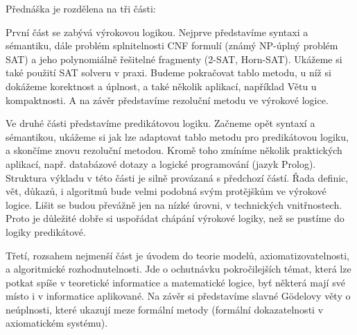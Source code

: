 Přednáška je rozdělena na tři části: 

První část se zabývá výrokovou logikou. Nejprve představíme syntaxi a sémantiku, dále problém splnitelnosti CNF formulí (známý NP-úplný problém SAT) a jeho polynomiálně řešitelné fragmenty (2-SAT, Horn-SAT). Ukážeme si také použití SAT solveru v praxi. Budeme pokračovat tablo metodu, u níž si dokážeme korektnost a úplnost, a také několik aplikací, například Větu u kompaktnosti. A na závěr představíme rezoluční metodu ve výrokové logice.

Ve druhé části představíme predikátovou logiku. Začneme opět syntaxí a sémantikou, ukážeme si jak lze adaptovat tablo metodu pro predikátovou logiku, a skončíme znovu rezoluční metodou. Kromě toho zmíníme několik praktických aplikací, např. databázové dotazy a logické programování (jazyk Prolog). Struktura výkladu v této části je silně provázaná s předchozí částí. Řada definic, vět, důkazů, i algoritmů bude velmi podobná svým protějškům ve výrokové logice. Lišit se budou převážně jen na nízké úrovni, v technických vnitřnostech. Proto je důležité dobře si uspořádat chápání výrokové logiky, než se pustíme do logiky predikátové. 

Třetí, rozsahem nejmenší část je úvodem do teorie modelů, axiomatizovatelnosti, a algoritmické rozhodnutelnosti. Jde o ochutnávku pokročilejších témat, která lze potkat spíše v teoretické informatice a matematické logice, byť některá mají své místo i v informatice aplikované. Na závěr si představíme slavné Gödelovy věty o neúplnosti, které ukazují meze formální metody (formální dokazatelnosti v axiomatickém systému). 

